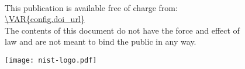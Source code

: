 
\begin{titlepage}
\begin{center}

\sffamily
\vspace{8pt}
\LARGE{\MakeUppercase{\textbf{}}}\\
\vspace{8pt}
\Large{}
\vfill

\normalsize This publication is available free of charge from:\\
\url{\VAR{config.doi_url}}\\
\vfill
\normalsize The contents of this document do not have the force and effect of\\
law and are not meant to bind the public in any way.
\vfill

\texttt{[image: nist-logo.pdf]}\\ 
\end{center}
\end{titlepage}
